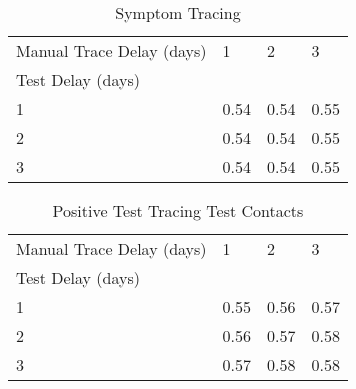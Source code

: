 \documentclass{article}
\begin{document}
    \begin{table}[H]
         \begin{tabular}{llll}
\toprule
Manual Trace Delay (days) &     1 &     2 &     3 \\
Test Delay (days) &       &       &       \\
\midrule
1                 &  0.54 &  0.54 &  0.55 \\
2                 &  0.54 &  0.54 &  0.55 \\
3                 &  0.54 &  0.54 &  0.55 \\
\bottomrule
\end{tabular}

        \caption{Symptom Tracing}
    \end{table}
    


    \begin{table}[H]
         \begin{tabular}{llll}
\toprule
Manual Trace Delay (days) &     1 &     2 &     3 \\
Test Delay (days) &       &       &       \\
\midrule
1                 &  0.55 &  0.56 &  0.57 \\
2                 &  0.56 &  0.57 &  0.58 \\
3                 &  0.57 &  0.58 &  0.58 \\
\bottomrule
\end{tabular}

        \caption{Positive Test Tracing Test Contacts}
    \end{table}
    

\clearpage
\end{document}
